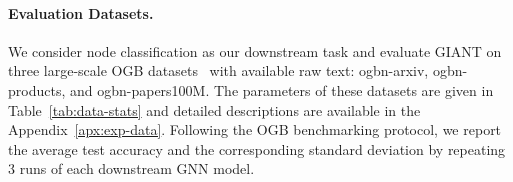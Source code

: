 \documentclass{article} %
\newcommand{\Eli}[1]{{\textcolor{blue}{[Eli: #1]}}}
\begin{document}
\begin{table}[t!]
\caption{Basic statistics of the OGB benchmark datasets~\citep{hu2020open}.}
\vspace{0.1cm}
\label{tab:data-stats}
\centering
{}
\vspace{-0.15in}
\end{table}

\paragraph{Evaluation Datasets.}
We consider node classification as our downstream task and evaluate GIANT on three large-scale OGB datasets~\citep{hu2020open} with available raw text: ogbn-arxiv, ogbn-products, and ogbn-papers100M. The parameters of these datasets are given in Table~\ref{tab:data-stats} and detailed descriptions are available in the Appendix~\ref{apx:exp-data}. Following the OGB benchmarking protocol, we report the average test accuracy and the corresponding standard deviation by repeating 3 runs of each downstream GNN model.
\end{document}
